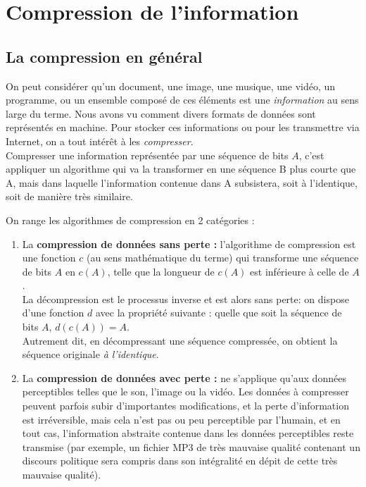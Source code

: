 \documentclass[a4paper,12pt,french]{book}
\begin{document}
\chapter*{Compression de l'information}


\section{La compression en général}
	
	On peut considérer qu'un document, une image, une musique, une vidéo, un programme, ou un ensemble composé de ces éléments est une 
	\textit{information} au sens large du terme.
	Nous avons vu comment divers formats de données sont représentés en machine.
	Pour stocker ces informations ou pour les transmettre via Internet, on a tout intérêt à les \textit{compresser}.\\
	
	Compresser une information représentée par une séquence de bits $A$, c'est appliquer un algorithme qui va la transformer en une séquence B plus 
	courte que A, mais dans laquelle l'information contenue dans A subsistera, soit à l'identique, soit de manière très similaire.

	On range les algorithmes de compression en 2 catégories :
\begin{enumerate}[--]

		\item 	La \textbf{compression de données sans perte :} l'algorithme de compression est une fonction $c$ (au sens mathématique du terme) qui 
		transforme une séquence de bits $A$ en $c(A)$, telle que la longueur de $c(A)$ est inférieure à celle de $A$.\\
				La décompression est le processus inverse et est alors sans perte: on dispose d'une fonction $d$ avec la propriété suivante : quelle 
				que soit la séquence de bits $A$, $d(c(A))=A$.\\
				Autrement dit, en décompressant une séquence compressée, on obtient la séquence originale \textit{à l'identique}.
		\item 	La \textbf{compression de données avec perte : } ne s'applique qu'aux données \og perceptibles\fg{} telles que le son, l'image ou la 
		vidéo. Les données à
				 compresser peuvent parfois subir d'importantes modifications, et la perte d'information est irréversible, mais cela n'est pas ou peu 
				 perceptible par 
				 l'humain, et en tout cas, l'information abstraite contenue dans les données perceptibles reste transmise (par exemple, un fichier 
				 MP3 de très mauvaise 						qualité contenant un discours politique sera compris dans son intégralité en dépit de 
				 cette très mauvaise qualité).\\
\end{enumerate}
\end{document}
